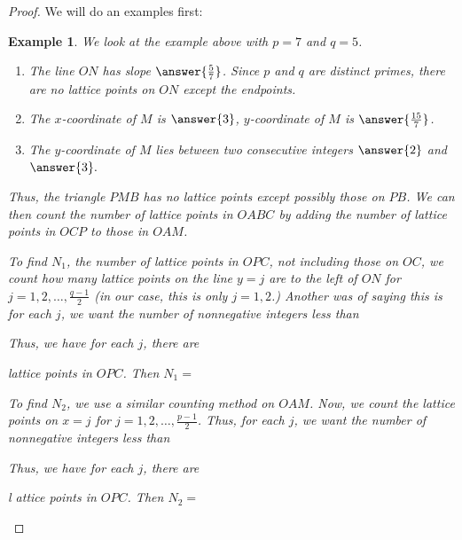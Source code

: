 \documentclass{ximera}
\newtheorem{ex}{Example}
\begin{document}
\begin{proof}
We will do an examples first:

\begin{ex}
 We look at the example above with $p=7$ and $q=5$.  
\begin{enumerate}[label=\alph*)]
 \item The line $ON$ has slope $\answer{\frac{5}{7}}
 $. Since $p$ and $q$ are distinct primes, there are no lattice points on $ON$ except the endpoints. 
 \item The $x$-coordinate of $M$ is $\answer{3}
 $, $y$-coordinate of $M$ is $\answer{\frac{15}{7}}
 $.
 \item The $y$-coordinate of $M$ lies between two consecutive integers $\answer{2}
 $ and $\answer{3}
 .$ 
\end{enumerate}

Thus, the triangle $PMB$ has no lattice points except possibly those on $PB$. We can then count the number of lattice points in $OABC$ by adding the number of lattice points in $OCP$ to those in $OAM$.

To find $N_1$, the number of lattice points in $OPC$, not including those on $OC$, we count how many lattice points on the line $y=j$ are to the left of $ON$ for $j=1,2,\dots,\frac{q-1}{2}$ (in our case, this is only $j=1,2$.) Another was of saying this is for each $j$, we want the number of nonnegative integers less than 
\begin{multipleChoice}
\end{multipleChoice}

 Thus, we have for each $j$, there are 
 \begin{multipleChoice}
\end{multipleChoice}
 
lattice points in $OPC$. Then $N_1=$
 \begin{multipleChoice}
\end{multipleChoice}

To find $N_2$, we use a similar counting method on $OAM$. Now, we count the lattice points on $x=j$ for $j=1,2,\dots,\frac{p-1}{2}$. Thus, for each $j$, we want the number of nonnegative integers less than \begin{multipleChoice}
\end{multipleChoice}
 Thus, we have for each $j$, there are  \begin{multipleChoice}
\end{multipleChoice}l
attice points in $OPC$. Then $N_2=$
 \begin{multipleChoice}
\end{multipleChoice}


\end{ex}
\end{proof}
\end{document}

